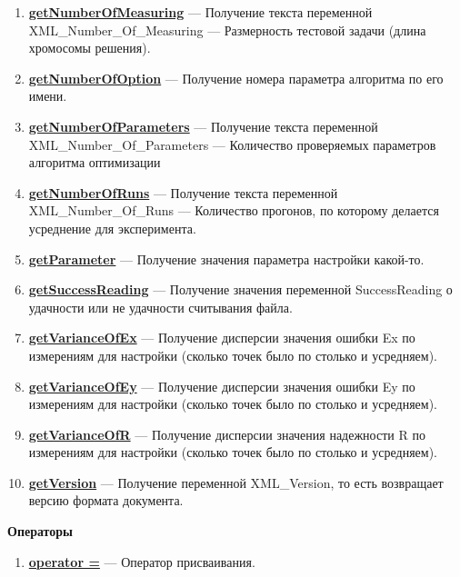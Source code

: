 \documentclass[a4paper,12pt]{article}
\begin{document}
\begin{enumerate}
\item \textbf{\hyperref[getNumberOfMeasuring]{getNumberOfMeasuring}} --- Получение текста переменной  XML\_Number\_Of\_Measuring --- Размерность тестовой задачи (длина хромосомы решения).

\item \textbf{\hyperref[getNumberOfOption]{getNumberOfOption}} --- Получение номера параметра алгоритма по его имени.

\item \textbf{\hyperref[getNumberOfParameters]{getNumberOfParameters}} --- Получение текста переменной  XML\_Number\_Of\_Parameters --- Количество проверяемых параметров алгоритма оптимизации

\item \textbf{\hyperref[getNumberOfRuns]{getNumberOfRuns}} --- Получение текста переменной  XML\_Number\_Of\_Runs --- Количество прогонов, по которому делается усреднение для эксперимента.

\item \textbf{\hyperref[getParameter]{getParameter}} --- Получение значения параметра настройки какой-то.

\item \textbf{\hyperref[getSuccessReading]{getSuccessReading}} --- Получение значения переменной SuccessReading о удачности или не удачности считывания файла.

\item \textbf{\hyperref[getVarianceOfEx]{getVarianceOfEx}} --- Получение дисперсии значения ошибки Ex по измерениям для настройки (сколько точек было по столько и усредняем).

\item \textbf{\hyperref[getVarianceOfEy]{getVarianceOfEy}} --- Получение дисперсии значения ошибки Ey по измерениям для настройки (сколько точек было по столько и усредняем).

\item \textbf{\hyperref[getVarianceOfR]{getVarianceOfR}} --- Получение дисперсии значения надежности R по измерениям для настройки (сколько точек было по столько и усредняем).

\item \textbf{\hyperref[getVersion]{getVersion}} --- Получение переменной XML\_Version, то есть возвращает версию формата документа.

\end{enumerate}

\textbf{Операторы}
\begin{enumerate}

\item \textbf{\hyperref[operator =]{operator =}} --- Оператор присваивания.

\end{enumerate}
\end{document}
